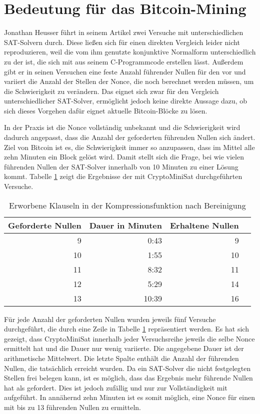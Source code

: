 \section{Bedeutung für das Bitcoin-Mining}

Jonathan Heusser führt in seinem Artikel \cite{jona:1} zwei Versuche mit unterschiedlichen SAT-Solvern durch.
Diese ließen sich für einen direkten Vergleich leider nicht reproduzieren, weil die vom ihm genutzte konjunktive
Normalform unterschiedlich zu der ist, die sich mit  aus seinem C-Programmcode erstellen lässt.
Außerdem gibt er in seinen Versuchen eine feste Anzahl führender Nullen für den  vor und variiert die
Anzahl der Stellen der Nonce, die noch berechnet werden müssen, um die Schwierigkeit zu verändern. Das eignet
sich zwar für den Vergleich unterschiedlicher SAT-Solver, ermöglicht jedoch keine direkte Aussage dazu, ob
sich dieses Vorgehen dafür eignet aktuelle Bitcoin-Blöcke zu lösen.

In der Praxis ist die Nonce vollständig unbekannt und die Schwierigkeit wird dadurch angepasst, dass die Anzahl
der geforderten führenden Nullen sich ändert. Ziel von Bitcoin ist es, die Schwierigkeit immer so anzupassen, dass im Mittel
alle zehn Minuten ein Block gelöst wird. Damit stellt sich die Frage, bei wie vielen führenden Nullen der SAT-Solver
innerhalb von 10 Minuten zu einer Lösung kommt. Tabelle \ref{fig:bitcoinzeros} zeigt die Ergebnisse der mit CryptoMiniSat
durchgeführten Versuche.

\begin{table}[!h]
  \centering
  \begin{tabular}{rr|rr}
    Geforderte Nullen & Dauer in Minuten & Erhaltene Nullen \\
    \hline
     9 &  0:43 &  9 \\
    10 &  1:55 & 10 \\
    11 &  8:32 & 11 \\
    12 &  5:29 & 14 \\
    13 & 10:39 & 16
  \end{tabular}
  \caption{Erworbene Klauseln in der Kompressionsfunktion nach Bereinigung}
  \label{fig:bitcoinzeros}
\end{table}

Für jede Anzahl der geforderten Nullen wurden jeweils fünf Versuche durchgeführt, die durch eine Zeile in Tabelle \ref{fig:bitcoinzeros}
repräsentiert werden. Es hat sich gezeigt, dass CryptoMiniSat innerhalb jeder Versuchsreihe jeweils die selbe Nonce ermittelt hat
und die Dauer nur wenig variierte. Die angegebene Dauer ist der arithmetische Mittelwert. Die letzte Spalte enthält die Anzahl der
führenden Nullen, die tatsächlich erreicht wurden. Da ein SAT-Solver die nicht festgelegten Stellen frei belegen kann, ist es möglich,
dass das Ergebnis mehr führende Nullen hat als gefordert. Dies ist jedoch zufällig und nur zur Vollständigkeit mit aufgeführt.
In annähernd zehn Minuten ist es somit möglich, eine Nonce für einen  mit bis zu 13 führenden Nullen zu ermitteln.

